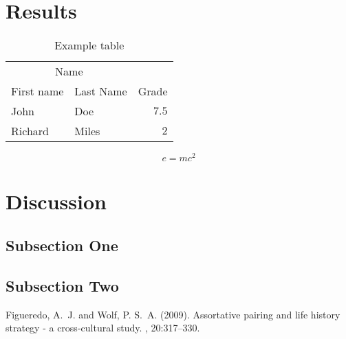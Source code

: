 \documentclass[twoside]{article}
\begin{document}
\begin{multicols}{2}

\section{Results}

\begin{table}[H]
\caption{Example table}
\centering
\begin{tabular}{llr}
\toprule
\multicolumn{2}{c}{Name} \\
\cmidrule(r){1-2}
First name & Last Name & Grade \\
\midrule
John & Doe & $7.5$ \\
Richard & Miles & $2$ \\
\bottomrule
\end{tabular}
\end{table}

\lipsum[5] %

\begin{equation}
\label{eq:emc}
e = mc^2
\end{equation}

\lipsum[6] %


\section{Discussion}

\subsection{Subsection One}

\lipsum[7] %

\subsection{Subsection Two}

\lipsum[8] %


\begin{thebibliography}{99} %

Figueredo, A.~J. and Wolf, P. S.~A. (2009).
\newblock Assortative pairing and life history strategy - a cross-cultural
  study.
, 20:317--330.
 
\end{thebibliography}


\end{multicols}
\end{document}
